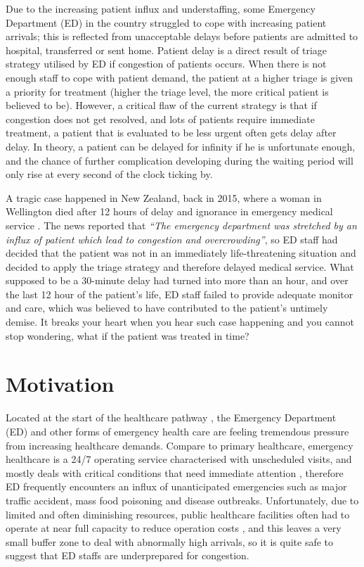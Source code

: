 \newpara

Due to the increasing patient influx and understaffing, some Emergency Department (ED) in the country struggled to cope with increasing patient arrivals; this is reflected from unacceptable delays before patients are admitted to hospital, transferred or sent home. Patient delay is a direct result of triage strategy \citep{MoH19triage} utilised by ED if congestion of patients occurs. When there is not enough staff to cope with patient demand, the patient at a higher triage is given a priority for treatment (higher the triage level, the more critical patient is believed to be). However, a critical flaw of the current strategy is that if congestion does not get resolved, and lots of patients require immediate treatment, a patient that is evaluated to be less urgent often gets delay after delay. In theory, a patient can be delayed for infinity if he is unfortunate enough, and the chance of further complication developing during the waiting period will only rise at every second of the clock ticking by. 

\newpara

A tragic case happened in New Zealand, back in 2015, where a woman in Wellington died after 12 hours of delay and ignorance in emergency medical service \citep{southland2015}. The news reported that \textit{“The emergency department was stretched by an influx of patient which lead to congestion and overcrowding”}, so ED staff had decided that the patient was not in an immediately life-threatening situation and decided to apply the triage strategy and therefore delayed medical service. What supposed to be a 30-minute delay had turned into more than an hour, and over the last 12 hour of the patient's life, ED staff failed to provide adequate monitor and care, which was believed to have contributed to the patient’s untimely demise.  It breaks your heart when you hear such case happening and you cannot stop wondering, what if the patient was treated in time? 

\section{Motivation}

Located at the start of the healthcare pathway \citep{MoH19pathway}, the Emergency Department (ED) and other forms of emergency health care are feeling tremendous pressure from increasing healthcare demands. Compare to primary healthcare, emergency healthcare is a 24/7 operating service characterised with unscheduled visits, and mostly deals with critical conditions that need immediate attention \citep{MoH19ed, MoH19primary}, therefore ED frequently encounters an influx of unanticipated emergencies such as major traffic accident, mass food poisoning and disease outbreaks. Unfortunately, due to limited and often diminishing resources, public healthcare facilities often had to operate at near full capacity to reduce operation costs \citep{salway2017emergency}, and this leaves a very small buffer zone to deal with abnormally high arrivals, so it is quite safe to suggest that ED staffs are underprepared for congestion.    

